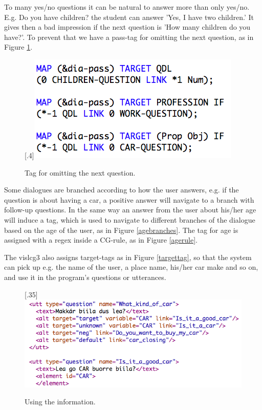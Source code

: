 \documentclass[11pt]{article}
\begin{document}
To many yes/no questions it can be natural to answer more than only yes/no. E.g. Do you have children? the student can answer 'Yes, I have two children.' It gives then a bad impression if the next question is 'How many children do you have?'. To prevent that we have a pass-tag for omitting the next question, as in Figure \ref{omit}.

\begin{figure}%
\begin{center}
\scalebox{.4}[.4]{\includegraphics{presentation/img/pass_rules.png}}\\
\caption{Tag for omitting the next question. 
}
\label{omit}
\end{center}
\end{figure}

 
 
Some dialogues are branched according to how the user answers, e.g. if the question is about having a car, a positive answer will navigate to a branch with follow-up questions. In the same way an answer from the user about his/her age will induce a tag, which is used to navigate to different branches of the dialogue based on the age of the user, as in Figure \ref{agebranches}. The tag for age is assigned with a regex inside a CG-rule, as in Figure \ref{agerule}.



The vislcg3 also assigns target-tags as in Figure \ref{targettag}, so that the system can pick up e.g. the name of the user, a place name, his/her car make and so on, and use it in the program's questions or utterances.


\begin{figure}%
\begin{center}
\scalebox{.35}[.35]{\includegraphics{presentation/img/what_car.png}}\\
\caption{Using the information.}
\end{center}
\end{figure}
\end{document}
